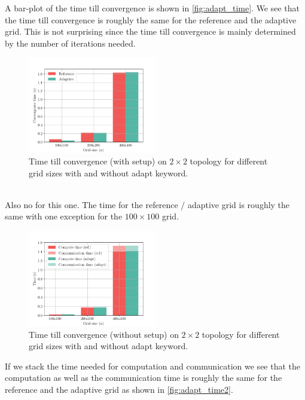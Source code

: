 A bar-plot of the time till convergence is shown in \autoref{fig:adapt_time}. We see that the time till convergence is roughly the same for the reference and the adaptive grid. This is not surprising since the time till convergence is mainly determined by the number of iterations needed. 

\begin{figure}[H]
    \centering
    \includegraphics[width=0.5\textwidth]{../fig/lab2/adapt_time.png}
    \caption{Time till convergence (with setup) on $2\times2$ topology for different grid sizes with and without adapt keyword.}
    \label{fig:adapt_time}
\end{figure}
\\
Also no for this one. The time for the reference / adaptive grid is roughly the same with one exception for the $100\times100$ grid.\\
\begin{figure}[H]
    \centering
    \includegraphics[width=0.5\textwidth]{../fig/lab2/adapt_stacked_time.png}
    \caption{Time till convergence (without setup) on $2\times2$ topology for different grid sizes with and without adapt keyword.}
    \label{fig:adapt_time2}
\end{figure}
If we stack the time needed for computation and communication we see that the computation as well as the communication time is roughly the same for the reference and the adaptive grid as shown in \autoref{fig:adapt_time2}.\\


